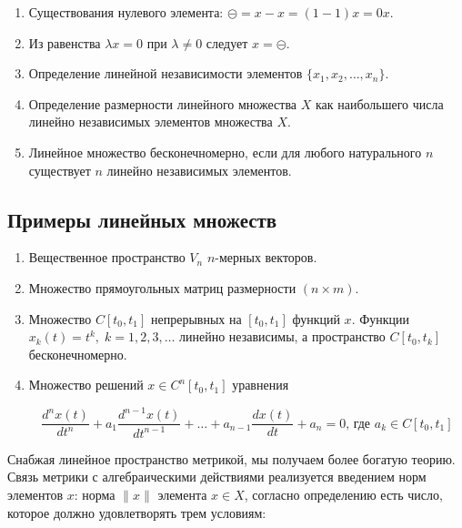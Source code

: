 \documentclass[12pt,a4paper,titlepage, oneside]{book}
\theoremstyle{definition}
\theoremstyle{plain}
\theoremstyle{remark}
\theoremstyle{remark}
\theoremstyle{remark}
\theoremstyle{remark}
\theoremstyle{plain}
\theoremstyle{plain}
\begin{document}
\begin{enumerate}

	\item Существования нулевого элемента: $\circleddash=x-x=(1-1)x=0x$.

	\item Из равенства $\lambda x=0$ при $\lambda\ne0$ следует $x=\circleddash$.

	\item Определение линейной независимости элементов $\{x_1,x_2, \ldots, x_n\}$.

	\item Определение размерности линейного множества $X$ как наибольшего числа линейно независимых элементов множества $X$.

	\item Линейное множество бесконечномерно, если для любого натурального $n$ существует $n$ линейно независимых элементов.

\end{enumerate}

\subsection*{Примеры линейных множеств}

\begin{enumerate}

	\item Вещественное пространство $V_n$ $n$-мерных векторов.

	\item Множество прямоугольных матриц размерности $(n\times m)$.

	\item Множество $C[t_0,t_1]$ непрерывных на $[t_0,t_1]$ функций $x$. Функции $x_k(t)=t^k,\; k=1,2,3,\ldots$ линейно независимы, а пространство $C[t_0,t_k]$ бесконечномерно.

	\item Множество решений $x\in C^n[t_0,t_1]$ уравнения

	\begin{equation*}
	\frac{d^nx(t)}{dt^n}+a_1\frac{d^{n-1}x(t)}{dt^{n-1}}+\ldots+a_{n-1}\frac{dx(t)}{dt}+a_n=0 \mbox{, где } a_k\in C[t_0,t_1]
	\end{equation*}

\end{enumerate}


Снабжая линейное пространство метрикой, мы получаем более богатую теорию. Связь метрики с алгебраическими действиями реализуется введением норм элементов $x$: норма $\lVert x\rVert$ элемента $x\in X$, согласно определению есть число, которое должно удовлетворять трем условиям:
\end{document}
